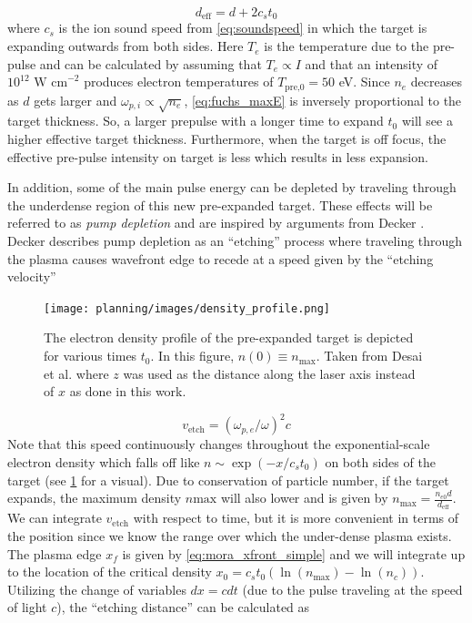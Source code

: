 \begin{equation}
	d_\text{eff} = d + 2 c_s t_0 \label{eq:d_eff}
\end{equation}
where $c_s$ is the ion sound speed from \cref{eq:soundspeed} in which the target is expanding outwards from both sides. Here $T_e$ is the temperature due to the pre-pulse and can be calculated by assuming that $T_e \propto I$ and that an intensity of $10^{12} \text{ W cm}^{-2}$ produces electron temperatures of $T_\text{pre,0} = 50$ eV. Since $n_e$ decreases as $d$ gets larger and $\omega_{p,i} \propto \sqrt{n_e}$, \cref{eq:fuchs_maxE} is inversely proportional to the target thickness. So, a larger prepulse with a longer time to expand $t_0$ will see a higher effective target thickness. Furthermore, when the target is off focus, the effective pre-pulse intensity on target is less which results in less expansion.

In addition, some of the main pulse energy can be depleted by traveling through the underdense region of this new pre-expanded target. These effects will be referred to as \emph{pump depletion} and are inspired by arguments from Decker \cite{Decker_1996_PoP}. Decker describes pump depletion as an ``etching'' process where traveling through the plasma causes wavefront edge to recede at a speed given by the ``etching velocity'' 

\begin{figure}
	\centering 
	\texttt{[image: planning/images/density\_profile.png]}
	\caption{The electron density profile of the pre-expanded target is depicted for various times $t_0$. In this figure, $n(0) \equiv n_\text{max}$. Taken from Desai et al. \cite{Desai_2024_arX} where $z$ was used as the distance along the laser axis instead of $x$ as done in this work. }
	\label{fig:density_profile}
\end{figure}
\begin{equation}
	v_\text{etch} = (\omega_{p,e}/\omega)^2 c \label{eq:vetch}
\end{equation}
Note that this speed continuously changes throughout the exponential-scale electron density which falls off like $n \sim \exp(-x/c_s t_0)$ on both sides of the target (see \cref{fig:density_profile} for a visual). Due to conservation of particle number, if the target expands, the maximum density $n\text{max}$ will also lower and is given by $n_\text{max} = \frac{n_{e0} d}{d_\text{eff}}$. We can integrate $v_\text{etch}$ with respect to time, but it is more convenient in terms of the position since we know the range over which the under-dense plasma exists. The plasma edge $x_f$ is given by \cref{eq:mora_xfront_simple} and we will integrate up to the location of the critical density $x_0 = c_s t_0 (\ln(n_\text{max}) - \ln(n_c))$. Utilizing the change of variables $dx = c dt$ (due to the pulse traveling at the speed of light $c$), the ``etching distance'' can be calculated as \cite{Desai_2024_arX} 

